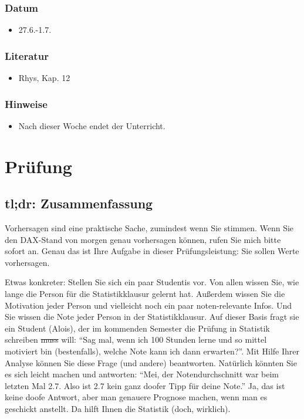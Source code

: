 \documentclass[
]{book}
\providecommand{\tightlist}{%
  \setlength{\itemsep}{0pt}\setlength{\parskip}{0pt}}
\begin{document}
\hypertarget{datum-14}{%
\subsection{Datum}\label{datum-14}}

\begin{itemize}
\tightlist
\item
  27.6.-1.7.
\end{itemize}

\hypertarget{literatur-13}{%
\subsection{Literatur}\label{literatur-13}}

\begin{itemize}
\tightlist
\item
  Rhys, Kap. 12
\end{itemize}

\hypertarget{hinweise-5}{%
\subsection{Hinweise}\label{hinweise-5}}

\begin{itemize}
\tightlist
\item
  Nach dieser Woche endet der Unterricht.
\end{itemize}

\hypertarget{pruxfcfung}{%
\chapter{Prüfung}\label{pruxfcfung}}

\hypertarget{tldr-zusammenfassung}{%
\section{tl;dr: Zusammenfassung}\label{tldr-zusammenfassung}}

Vorhersagen sind eine praktische Sache, zumindest wenn Sie stimmen.
Wenn Sie den DAX-Stand von morgen genau vorhersagen können,
rufen Sie mich bitte sofort an. Genau das ist Ihre Aufgabe in dieser Prüfungsleistung:
Sie sollen Werte vorhersagen.

Etwas konkreter: Stellen Sie sich ein paar Studentis vor.
Von allen wissen Sie, wie lange die Person für die Statistikklausur gelernt hat.
Außerdem wissen Sie die Motivation jeder Person und vielleicht noch ein paar noten-relevante Infos.
Und Sie wissen die Note jeder Person in der Statistikklausur.
Auf dieser Basis fragt sie ein Student (Alois), der im kommenden Semester die Prüfung in Statistik schreiben \sout{muss} will:
``Sag mal, wenn ich 100 Stunden lerne und so mittel motiviert bin (bestenfalls), welche Note kann ich dann erwarten?''.
Mit Hilfe Ihrer Analyse können Sie diese Frage (und andere) beantworten.
Natürlich könnten Sie es sich leicht machen und antworten:
``Mei, der Notendurchschnitt war beim letzten Mal 2.7.
Also ist 2.7 kein ganz doofer Tipp für deine Note.''
Ja, das ist keine doofe Antwort, aber man genauere Prognose machen,
wenn man es geschickt anstellt.
Da hilft Ihnen die Statistik (doch, wirklich).
\end{document}
